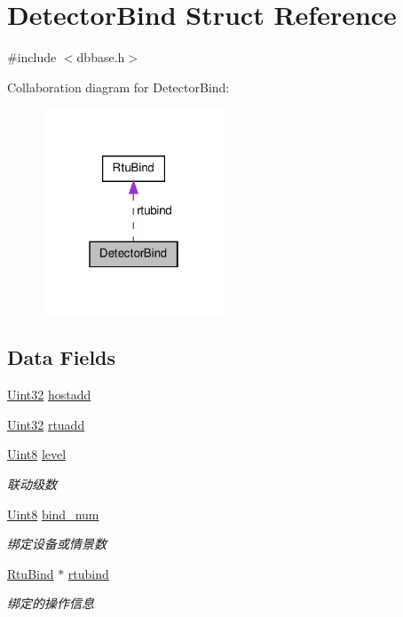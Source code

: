 \hypertarget{structDetectorBind}{\section{Detector\-Bind Struct Reference}
\label{structDetectorBind}
}


{\ttfamily \#include $<$dbbase.\-h$>$}



Collaboration diagram for Detector\-Bind\-:\nopagebreak
\begin{figure}[H]
\begin{center}
\leavevmode
\includegraphics[width=154pt]{structDetectorBind__coll__graph}
\end{center}
\end{figure}
\subsection*{Data Fields}
\begin{DoxyCompactItemize}
\item 
\hyperlink{base_8h_a60cf7b3c038ce37a50796e8eaddf0b5f}{Uint32} \hyperlink{structDetectorBind_aafe967553a211b4b4659d5eb8503f01a}{hostadd}
\item 
\hyperlink{base_8h_a60cf7b3c038ce37a50796e8eaddf0b5f}{Uint32} \hyperlink{structDetectorBind_ac36a0d856c55e3567781683860435cdd}{rtuadd}
\item 
\hyperlink{base_8h_af84840501dec18061d18a68c162a8fa2}{Uint8} \hyperlink{structDetectorBind_af1ee9714c6d13cb58952b8ac210de246}{level}
\begin{DoxyCompactList}\small\item\em 联动级数 \end{DoxyCompactList}\item 
\hyperlink{base_8h_af84840501dec18061d18a68c162a8fa2}{Uint8} \hyperlink{structDetectorBind_aeb689d428cfe88f8f3f1402bf7f56e2e}{bind\-\_\-num}
\begin{DoxyCompactList}\small\item\em 绑定设备或情景数 \end{DoxyCompactList}\item 
\hyperlink{structRtuBind}{Rtu\-Bind} $\ast$ \hyperlink{structDetectorBind_a051da44e061843becfc64dd40e8a2d75}{rtubind}
\begin{DoxyCompactList}\small\item\em 绑定的操作信息 \end{DoxyCompactList}\end{DoxyCompactItemize}


